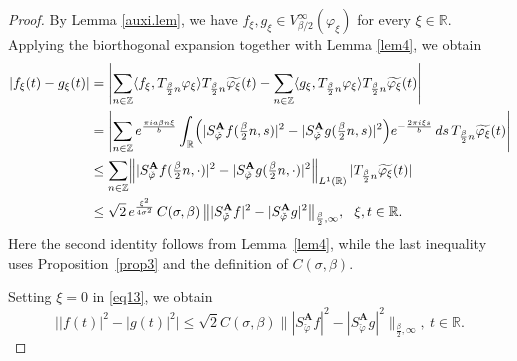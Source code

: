 \documentclass[11pt, reqno]{amsart}
\newcommand{\Z}{\mathbb{Z}}
\newcommand{\R}{\mathbb{R}}
\numberwithin{equation}{section}
\begin{document}
\begin{proof}
By Lemma \ref{auxi.lem},  we have $f_\xi, g_\xi\in V_{\beta/2}^{\infty}(\varphi_\xi)$ for every $\xi\in\R$.
Applying the biorthogonal expansion together with Lemma \ref{lem4}, we obtain
\begin{align}\label{eq13}
    |f_\xi(t)-g_\xi(t)|  &=
    \left|   \sum_{n\in\Z}  \langle f_\xi,T_{\frac{\beta}{2}n}\varphi_\xi\rangle
    T_{\frac{\beta}{2}n}\widetilde{\varphi_\xi}(t)   -   \sum_{n\in\Z}   \langle g_\xi,T_{\frac{\beta}{2}n}\varphi_\xi\rangle T_{\frac{\beta}{2}n}\widetilde{\varphi_\xi}(t) \right| \notag\\
    &= \left|  \sum_{n\in\Z}  e^{\frac{\pi ia\beta n\xi}{b}}  \int_{\R}
    \Bigl(   |S_{\check{\varphi}}^{\mathbf A}f(\tfrac{\beta}{2}n,s)|^2 -   |S_{\check{\varphi}}^{\mathbf A}g(\tfrac{\beta}{2}n,s)|^2\Bigr) e^{-\frac{2\pi i\xi s}{b}}\,ds\, T_{\frac{\beta}{2}n}\widetilde{\varphi_\xi}(t)    \right| \notag\\
    &\le   \sum_{n\in\Z}  \Bigl\|
    |S_{\check{\varphi}}^{\mathbf A}f(\tfrac{\beta}{2}n,\cdot)|^2  -
    |S_{\check{\varphi}}^{\mathbf A}g(\tfrac{\beta}{2}n,\cdot)|^2  \Bigr\|_{L^1(\R)}  \,
   |T_{\frac{\beta}{2}n}\widetilde{\varphi_\xi}(t)| \notag\\
    &\le \sqrt{2}\,   e^{\frac{\xi^2}{4\sigma^2}}\,  C(\sigma,\beta)\,    \bigl\|
    |S_{\check{\varphi}}^{\mathbf A}f|^2  -  |S_{\check{\varphi}}^{\mathbf A}g|^2
    \bigr\|_{\frac{\beta}{2},\infty}, \ \  \xi,t\in\R.
\end{align}
Here the second identity follows from Lemma~\ref{lem4}, while the last inequality
uses Proposition~\ref{prop3} and the definition of $C(\sigma,\beta)$.

Setting $\xi=0$ in \eqref{eq13}, we obtain
\begin{equation}\label{abs.eq1}
    \bigl||f(t)|^2-|g(t)|^2\bigr|   \le  \sqrt{2}C(\sigma,\beta)  \bigl\|
    |S_{\check{\varphi}}^{\mathbf A}f|^2   -    |S_{\check{\varphi}}^{\mathbf A}g|^2
    \bigr\|_{\frac{\beta}{2},\infty},
\  t\in\R.
\end{equation}


\end{proof}
\end{document}
